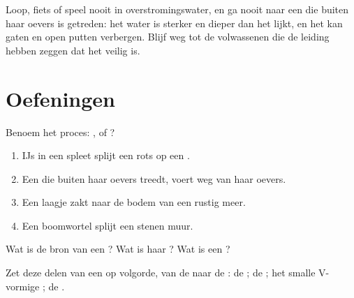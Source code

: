 \begin{safety}
Loop, fiets of speel nooit in overstromingswater, en ga nooit naar een
 die buiten haar oevers is getreden: het water is sterker en dieper
dan het lijkt, en het kan gaten en open putten verbergen. Blijf weg tot de
volwassenen die de leiding hebben zeggen dat het veilig is.
\end{safety}

\section{Oefeningen}

\begin{exercise}[$\star$]\label{exo:g5:water-shapes-the-land:1}
Benoem het proces: ,  of ?
\begin{enumerate}
  \item[(a)] IJs in een spleet splijt een rots op een .
  \item[(b)] Een  die buiten haar oevers treedt, voert  weg van
        haar oevers.
  \item[(c)] Een laagje  zakt naar de bodem van een rustig meer.
  \item[(d)] Een boomwortel splijt een stenen muur.
\end{enumerate}
\end{exercise}

\begin{exercise}[$\star$]\label{exo:g5:water-shapes-the-land:2}
Wat is de bron van een ? Wat is haar ? Wat is een ?
\end{exercise}

\begin{exercise}[$\star$]\label{exo:g5:water-shapes-the-land:3}
Zet deze delen van een  op volgorde, van de  naar de : de
; de ; het smalle V-vormige ; de .
\end{exercise}

